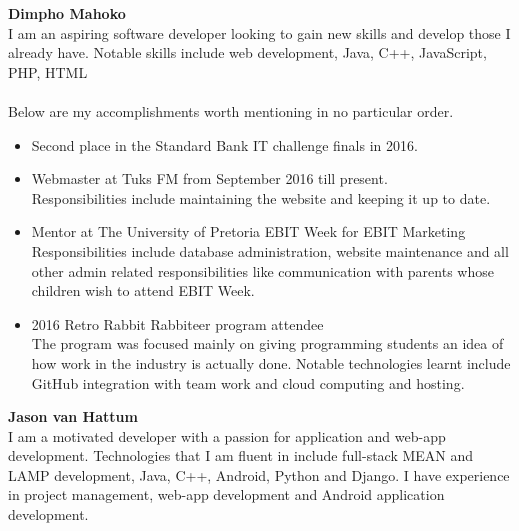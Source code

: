 \textbf{Dimpho Mahoko} \\
	I am an aspiring software developer looking to gain new skills and develop those I already have. Notable skills include web development, Java, C++, JavaScript, PHP, HTML  \\ \\ %
	 Below are my accomplishments worth mentioning in no particular order.
	\begin{itemize}
		\item Second place in the Standard Bank IT challenge finals in 2016.\\
	
		\item Webmaster at Tuks FM from September 2016 till present. \\ 
			Responsibilities include maintaining the website and keeping it up to date. \\
			
		\item Mentor at The University of Pretoria EBIT Week for EBIT Marketing \\
			Responsibilities include database administration, website maintenance and all other admin related responsibilities like communication with parents whose children wish to attend EBIT Week. \\
			
		\item 2016 Retro Rabbit Rabbiteer program attendee \\
			The program was focused mainly on giving programming students an idea of how work in the industry is actually done. Notable technologies learnt include GitHub integration with team work and cloud computing and hosting. \\%
	\end{itemize}
	

\textbf{Jason van Hattum}\\ 
    I am a motivated developer with a passion for application and web-app development. Technologies that I am fluent in include full-stack MEAN and LAMP development, Java, C++, Android, Python and Django. I have experience in project management, web-app development and Android application development. \\
    
